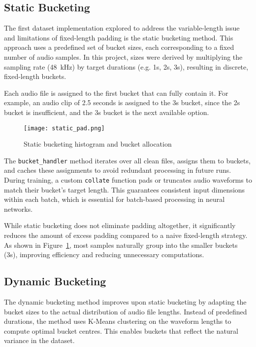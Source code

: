 \subsection{Static Bucketing}
\label{subsec:static_dataset}

The first dataset implementation explored to address the variable-length issue and limitations of fixed-length padding is the static bucketing method. This approach uses a predefined set of bucket sizes, each corresponding to a fixed number of audio samples. In this project, sizes were derived by multiplying the sampling rate (48~kHz) by target durations (e.g. 1s, 2s, 3s), resulting in discrete, fixed-length buckets.

Each audio file is assigned to the first bucket that can fully contain it. For example, an audio clip of 2.5 seconds is assigned to the 3s bucket, since the 2s bucket is insufficient, and the 3s bucket is the next available option.

\begin{figure}[H]
    \centering
    \texttt{[image: static\_pad.png]}
    \caption{Static bucketing histogram and bucket allocation}
    \label{fig:static_pad}
\end{figure}

The \texttt{bucket\_handler} method iterates over all clean files, assigns them to buckets, and caches these assignments to avoid redundant processing in future runs. During training, a custom \texttt{collate} function pads or truncates audio waveforms to match their bucket’s target length. This guarantees consistent input dimensions within each batch, which is essential for batch-based processing in neural networks.

While static bucketing does not eliminate padding altogether, it significantly reduces the amount of excess padding compared to a naive fixed-length strategy. As shown in Figure~\ref{fig:static_pad}, most samples naturally group into the smaller buckets (3s), improving efficiency and reducing unnecessary computations.

\subsection{Dynamic Bucketing}
\label{subsec:dynamic_dataset}

The dynamic bucketing method improves upon static bucketing by adapting the bucket sizes to the actual distribution of audio file lengths. Instead of predefined durations, the method uses K-Means clustering on the waveform lengths to compute optimal bucket centres. This enables buckets that reflect the natural variance in the dataset.

